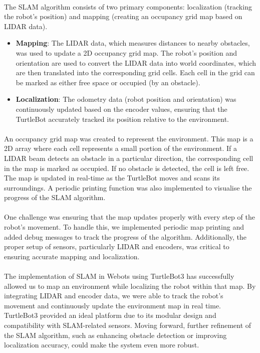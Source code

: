 \paragraph*{}
The SLAM algorithm consists of two primary components: localization (tracking the robot’s position) and mapping (creating an occupancy grid map based on LIDAR data).

\begin{itemize}
    \item \textbf{Mapping}: The LIDAR data, which measures distances to nearby obstacles, was used to update a 2D occupancy grid map. The robot’s position and orientation are used to convert the LIDAR data into world coordinates, which are then translated into the corresponding grid cells. Each cell in the grid can be marked as either free space or occupied (by an obstacle).
    \item \textbf{Localization}: The odometry data (robot position and orientation) was continuously updated based on the encoder values, ensuring that the TurtleBot accurately tracked its position relative to the environment.
\end{itemize}

\paragraph*{}
An occupancy grid map was created to represent the environment. This map is a 2D array where each cell represents a small portion of the environment. If a LIDAR beam detects an obstacle in a particular direction, the corresponding cell in the map is marked as occupied. If no obstacle is detected, the cell is left free. The map is updated in real-time as the TurtleBot moves and scans its surroundings. A periodic printing function was also implemented to visualise the progress of the SLAM algorithm.

\paragraph*{}
One challenge was ensuring that the map updates properly with every step of the robot’s movement. To handle this, we implemented periodic map printing and added debug messages to track the progress of the algorithm. Additionally, the proper setup of sensors, particularly LIDAR and encoders, was critical to ensuring accurate mapping and localization.

\paragraph*{}
The implementation of SLAM in Webots using TurtleBot3 has successfully allowed us to map an environment while localizing the robot within that map. By integrating LIDAR and encoder data, we were able to track the robot’s movement and continuously update the environment map in real time. TurtleBot3 provided an ideal platform due to its modular design and compatibility with SLAM-related sensors. Moving forward, further refinement of the SLAM algorithm, such as enhancing obstacle detection or improving localization accuracy, could make the system even more robust.

